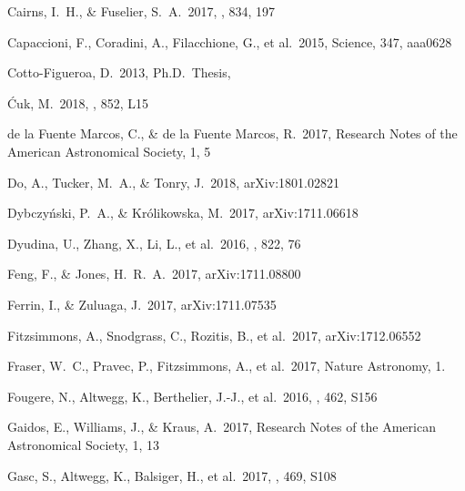 \documentclass[a4paper,fleqn,usenatbib]{mnras}
\begin{document}
\begin{thebibliography}{99}

 Cairns, I.~H., \& Fuselier, S.~A.\ 2017, \apj, 834, 197

 Capaccioni, F., Coradini, A., Filacchione, G., et al.\ 2015, Science, 347, aaa0628 

 Cotto-Figueroa, D.\ 2013, Ph.D.~Thesis,  

 {\'C}uk, M.\ 2018, \apjl, 852, L15

 de la Fuente Marcos, C., \& de la Fuente Marcos, R.\ 2017, Research Notes of the American Astronomical Society, 1, 5

 Do, A., Tucker, M.~A., \& Tonry, J.\ 2018, arXiv:1801.02821

 Dybczy{\'n}ski, P.~A., \& Kr{\'o}likowska, M.\ 2017, arXiv:1711.06618

 Dyudina, U., Zhang, X., Li, L., et al.\ 2016, \apj, 822, 76 

 Feng, F., \& Jones, H.~R.~A.\ 2017, arXiv:1711.08800

 Ferrin, I., \& Zuluaga, J.\ 2017, arXiv:1711.07535

 Fitzsimmons, A., Snodgrass, C., Rozitis, B., et al.\ 2017, arXiv:1712.06552

 Fraser, W.~C., Pravec, P., Fitzsimmons, A., et al.\ 2017, Nature Astronomy, 1.

 Fougere, N., Altwegg, K., Berthelier, J.-J., et al.\ 2016, \mnras, 462, S156 

 Gaidos, E., Williams, J., \& Kraus, A.\ 2017, Research Notes of the American Astronomical Society, 1, 13

 Gasc, S., Altwegg, K., Balsiger, H., et al.\ 2017, \mnras, 469, S108 


\end{thebibliography}
\end{document}
